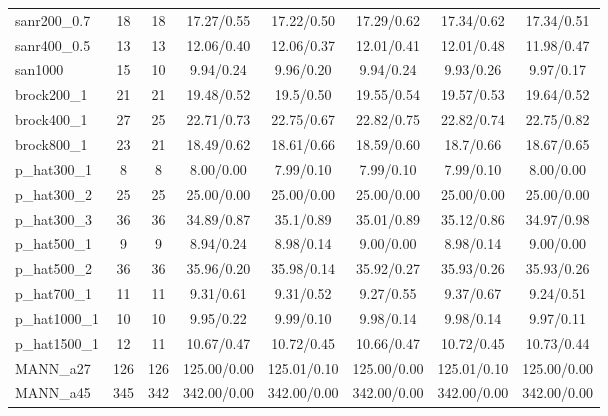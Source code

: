 \documentclass[11pt]{article}
\begin{document}
\begin{table*}[ht!]
\begin{footnotesize}
\begin{center}
\begin{tabular}{|l||c|c||c|c|c|c|c|}
\hline
sanr200\_0.7 	&18 &18  &17.27/0.55 &17.22/0.50 &17.29/0.62 &17.34/0.62 &17.34/0.51\\
sanr400\_0.5 	&13 &13  &12.06/0.40 &12.06/0.37 &12.01/0.41 &12.01/0.48 &11.98/0.47\\
san1000 	    &15 &10  &9.94/0.24 &9.96/0.20 &9.94/0.24 &9.93/0.26 &9.97/0.17\\
\hline
brock200\_1 	&21 &21  &19.48/0.52 &19.5/0.50 &19.55/0.54 &19.57/0.53 &19.64/0.52\\
brock400\_1 	&27 &25  &22.71/0.73 &22.75/0.67 &22.82/0.75 &22.82/0.74 &22.75/0.82\\
brock800\_1 	&23 &21  & 18.49/0.62 &18.61/0.66 &18.59/0.60 &18.7/0.66 &18.67/0.65\\
\hline
p\_hat300\_1 	&8 	&8   &8.00/0.00 &7.99/0.10 &7.99/0.10 &7.99/0.10 &8.00/0.00\\
p\_hat300\_2 	&25	&25  &25.00/0.00 &25.00/0.00 &25.00/0.00 &25.00/0.00 &25.00/0.00\\
p\_hat300\_3 	&36 &36  &34.89/0.87 &35.1/0.89 &35.01/0.89 &35.12/0.86 &34.97/0.98\\
p\_hat500\_1 	&9 	&9   &8.94/0.24 &8.98/0.14 &9.00/0.00 &8.98/0.14 &9.00/0.00 \\
p\_hat500\_2 	&36 &36  &35.96/0.20 &35.98/0.14 &35.92/0.27 &35.93/0.26 &35.93/0.26\\
p\_hat700\_1 	&11 &11  &9.31/0.61 &9.31/0.52 &9.27/0.55 &9.37/0.67 &9.24/0.51\\
p\_hat1000\_1 	&10 &10  &9.95/0.22 &9.99/0.10 &9.98/0.14 &9.98/0.14 &9.97/0.11\\
p\_hat1500\_1 	&12 &11	 &10.67/0.47 &10.72/0.45 &10.66/0.47 &10.72/0.45 &10.73/0.44\\
\hline
MANN\_a27 	&126 &126 &125.00/0.00 &125.01/0.10 &125.00/0.00 &125.01/0.10 &125.00/0.00\\
MANN\_a45 	&345 &342 &342.00/0.00 &342.00/0.00 &342.00/0.00 &342.00/0.00 &342.00/0.00 \\
\hline
\end{tabular}
\end{center}
\end{footnotesize}
\end{table*}
\linespread{1.3}
\end{document}
